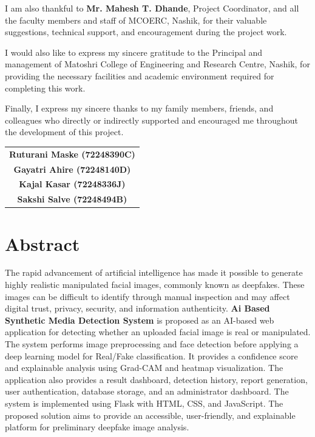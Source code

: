 \documentclass[12pt,a4paper,oneside]{report}
\begin{document}
I am also thankful to \textbf{Mr. Mahesh T. Dhande}, Project Coordinator, and all the faculty members and staff of MCOERC, Nashik, for their valuable suggestions, technical support, and encouragement during the project work.

I would also like to express my sincere gratitude to the Principal and management of Matoshri College of Engineering and Research Centre, Nashik, for providing the necessary facilities and academic environment required for completing this work.

Finally, I express my sincere thanks to my family members, friends, and colleagues who directly or indirectly supported and encouraged me throughout the development of this project.

\vspace{1.5cm}

\begin{flushright}
\begin{tabular}{c}
\textbf{Ruturani Maske (72248390C)} \\[0.2cm]
\textbf{Gayatri Ahire (72248140D)} \\[0.2cm]
\textbf{Kajal Kasar (72248336J)} \\[0.2cm]
\textbf{Sakshi Salve (72248494B)}
\end{tabular}
\end{flushright}


\chapter*{Abstract}

The rapid advancement of artificial intelligence has made it possible to generate highly realistic manipulated facial images, commonly known as deepfakes. These images can be difficult to identify through manual inspection and may affect digital trust, privacy, security, and information authenticity. \textbf{Ai Based Synthetic Media Detection System} is proposed as an AI-based web application for detecting whether an uploaded facial image is real or manipulated. The system performs image preprocessing and face detection before applying a deep learning model for Real/Fake classification. It provides a confidence score and explainable analysis using Grad-CAM and heatmap visualization. The application also provides a result dashboard, detection history, report generation, user authentication, database storage, and an administrator dashboard. The system is implemented using Flask with HTML, CSS, and JavaScript. The proposed solution aims to provide an accessible, user-friendly, and explainable platform for preliminary deepfake image analysis.
\end{document}
